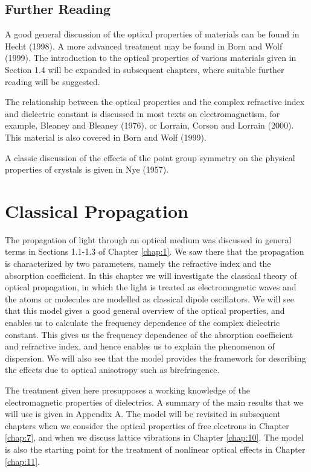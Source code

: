 \documentclass[12pt]{book}
\begin{document}
\section*{Further Reading}

A good general discussion of the optical properties of materials can be found in Hecht (1998). A more advanced treatment may be found in Born and Wolf (1999). The introduction to the optical properties of various materials given in Section 1.4 will be expanded in subsequent chapters, where suitable further reading will be suggested.

The relationship between the optical properties and the complex refractive index and dielectric constant is discussed in most texts on electromagnetism, for example, Bleaney and Bleaney (1976), or Lorrain, Corson and Lorrain (2000). This material is also covered in Born and Wolf (1999).

A classic discussion of the effects of the point group symmetry on the physical properties of crystals is given in Nye (1957).

\chapter{Classical Propagation}\label{chap:2}
\begin{shaded}

The propagation of light through an optical medium was discussed in general terms in Sections 1.1-1.3 of Chapter \ref{chap:1}. We saw there that the propagation is characterized by two parameters, namely the refractive index and the absorption coefficient. In this chapter we will investigate the classical theory of optical propagation, in which the light is treated as electromagnetic waves and the atoms or molecules are modelled as classical dipole oscillators. We will see that this model gives a good general overview of the optical properties, and enables us to calculate the frequency dependence of the complex dielectric constant. This gives us the frequency dependence of the absorption coefficient and refractive index, and hence enables us to explain the phenomenon of dispersion. We will also see that the model provides the framework for describing the effects due to optical anisotropy such as birefringence.

The treatment given here presupposes a working knowledge of the electromagnetic properties of dielectrics. A summary of the main results that we will use is given in Appendix A. The model will be revisited in subsequent chapters when we consider the optical properties of free electrons in Chapter \ref{chap:7}, and when we discuss lattice vibrations in Chapter \ref{chap:10}. The model is also the starting point for the treatment of nonlinear optical effects in Chapter \ref{chap:11}.
\end{shaded}
\end{document}
